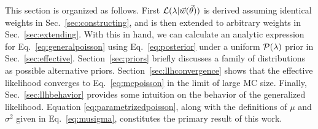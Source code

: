 This section is organized as follows.
First $\mathcal{L}(\lambda|\vec{w}(\vec{\theta}))$ is derived assuming identical weights in Sec.~\ref{sec:constructing}, and is then extended to arbitrary weights in Sec.~\ref{sec:extending}.
With this in hand, we can calculate an analytic expression for Eq.~\eqref{eq:generalpoisson} using Eq.~\eqref{eq:posterior} under a uniform $\mathcal{P}(\lambda)$ prior in Sec.~\ref{sec:effective}.
Section~\ref{sec:priors} briefly discusses a family of distributions as possible alternative priors.
Section~\ref{sec:llhconvergence} shows that the effective likelihood converges to Eq.~\eqref{eq:mcpoisson} in the limit of large MC size.
Finally, Sec.~\ref{sec:llhbehavior} provides some intuition on the behavior of the generalized likelihood.
Equation \eqref{eq:parametrizedpoisson}, along with the definitions of $\mu$ and $\sigma^2$ given in Eq.~\eqref{eq:musigma}, constitutes the primary result of this work.
